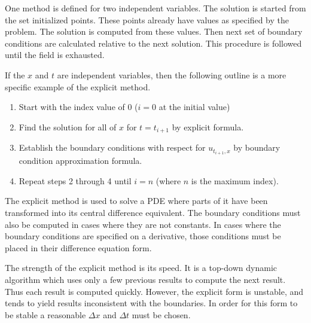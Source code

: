 One method is defined for two independent variables.  The solution is started from the set initialized points.  These points already have values as specified by the problem.  The solution is computed from these values.  Then next set of boundary conditions are calculated relative to the next solution.  This procedure is followed until the field is exhausted.   

If the $x$ and $t$ are independent variables, then the following outline is a more specific example of the explicit method.  
\begin{enumerate}
\item Start with the index value of 0 ($i=0$ at the initial value)
\item Find the solution for all of $x$ for $t=t_{i+1} $ by explicit formula.
\item Establish the boundary conditions with respect for $u_{t_{i+1} ,x}$ by boundary condition approximation formula.
\item Repeat steps 2 through 4 until $i = n$ (where $n$ is the maximum index).
\end{enumerate}


The explicit method is used to solve a PDE where parts of it have been transformed into its central difference equivalent.  The boundary conditions must also be computed in cases where they are not constants.  In cases where the boundary conditions are specified on a derivative, those conditions must be placed in their difference equation form.  %

The strength of the explicit method is its speed.  It is a top-down dynamic algorithm which uses only a few previous results to compute the next result.  Thus each result is computed quickly.  However, the
explicit form is unstable, and tends to yield results inconsistent with the boundaries.   In order for this form to be stable a reasonable $\Delta x$ and $\Delta t$ must be chosen.  



